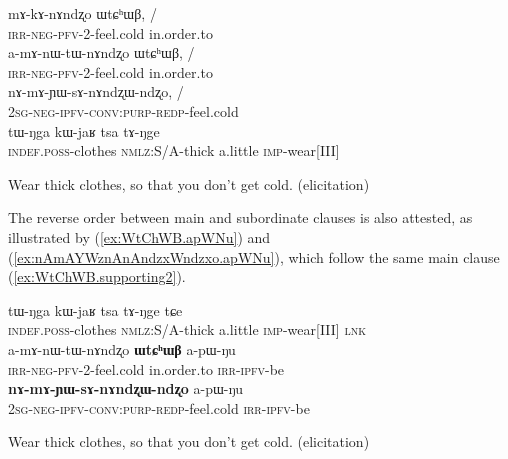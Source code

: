 \documentclass[oldfontcommands,oneside,a4paper,11pt]{article}
\newcommand{\ipa}[1]{{\phon \mbox{#1}}} %
\newcommand{\refb}[1]{(\ref{#1})}
\begin{document}
 \begin{exe}
\ex \label{ex:WtChWB}  \begin{xlist}
\ex
 \gll 
\ipa{mɤ-kɤ-nɤndʐo} 	\ipa{ɯtɕʰɯβ,} 	/\\
 \textsc{irr-neg-pfv}-2-feel.cold in.order.to\\
 \ex
 \gll 
\ipa{a-mɤ-nɯ-tɯ-nɤndʐo} 	\ipa{ɯtɕʰɯβ,} / \\
 \textsc{irr-neg-pfv}-2-feel.cold in.order.to\\
 \ex \label{ex:nAmAsAnAndzxWndzxo}  
 \gll 
 \ipa{nɤ-mɤ-ɲɯ-sɤ-nɤndʐɯ-ndʐo,} /\\
 \textsc{2sg-neg-ipfv-conv:purp-redp}-feel.cold\\
 \ex  \label{ex:WtChWB.supporting}  
 \gll 
 \ipa{tɯ-ŋga}    	\ipa{kɯ-jaʁ}    	\ipa{tsa}    	\ipa{tɤ-ŋge}  \\
 \textsc{indef.poss}-clothes \textsc{nmlz}:S/A-thick a.little \textsc{imp}-wear[III] \\
  \end{xlist}
 \glt Wear thick clothes, so that you don't get cold. (elicitation)
  \end{exe}
 
The reverse order  between main and subordinate clauses is also attested,   as illustrated by \refb{ex:WtChWB.apWNu} and \refb{ex:nAmAYWznAnAndzxWndzxo.apWNu}, which follow the same   main clause \refb{ex:WtChWB.supporting2}.

\begin{exe}
\ex \begin{xlist}
 \ex \label{ex:WtChWB.supporting2}  
\gll 
 \ipa{tɯ-ŋga}    	\ipa{kɯ-jaʁ}    	\ipa{tsa}    	\ipa{tɤ-ŋge} \ipa{tɕe}\\
 \textsc{indef.poss}-clothes \textsc{nmlz}:S/A-thick a.little \textsc{imp}-wear[III]  \textsc{lnk}\\ 
 \ex \label{ex:WtChWB.apWNu}  
\gll 
 	\ipa{a-mɤ-nɯ-tɯ-nɤndʐo}    	\ipa{\textbf{ɯtɕʰɯβ}}    	\ipa{a-pɯ-ŋu}    	\\
  \textsc{irr-neg-pfv}-2-feel.cold in.order.to \textsc{irr-ipfv}-be \\
\ex \label{ex:nAmAYWznAnAndzxWndzxo.apWNu}
\gll
\ipa{\textbf{nɤ-mɤ-ɲɯ-sɤ-nɤndʐɯ-ndʐo}}    	\ipa{a-pɯ-ŋu}\\
 \textsc{2sg-neg-ipfv-conv:purp-redp}-feel.cold \textsc{irr-ipfv}-be\\
  \end{xlist}
\glt Wear thick clothes, so that you don't get cold. (elicitation)
 \end{exe}
\end{document}
